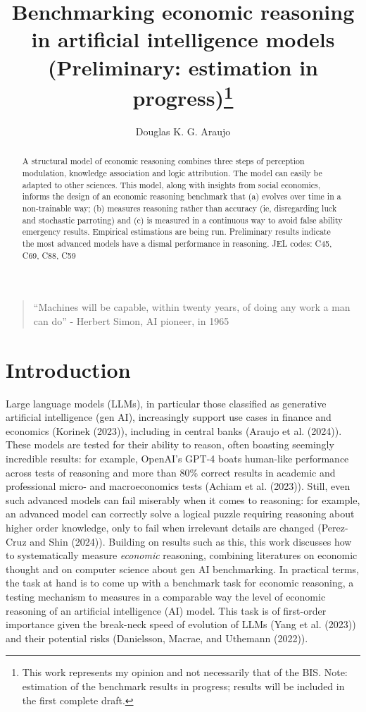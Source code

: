 \documentclass[
]{article}
\title{Benchmarking economic reasoning in artificial intelligence models
(Preliminary: estimation in progress)\thanks{This work represents my
opinion and not necessarily that of the BIS. Note: estimation of the
benchmark results in progress; results will be included in the first
complete draft.}}
\author{Douglas K. G. Araujo}
\affil{%
                  Bank for International
Settlements, douglas.araujo@bis.org
              }
\date{}
\begin{document}
\maketitle
\begin{abstract}
A structural model of economic reasoning combines three steps of
perception modulation, knowledge association and logic attribution. The
model can easily be adapted to other sciences. This model, along with
insights from social economics, informs the design of an economic
reasoning benchmark that (a) evolves over time in a non-trainable way;
(b) measures reasoning rather than accuracy (ie, disregarding luck and
stochastic parroting) and (c) is measured in a continuous way to avoid
false ability emergency results. Empirical estimations are being run.
Preliminary results indicate the most advanced models have a dismal
performance in reasoning. JEL codes: C45, C69, C88, C59
\end{abstract}

\begin{quote}
``Machines will be capable, within twenty years, of doing any work a man
can do'' - Herbert Simon, AI pioneer, in 1965
\end{quote}

\section{Introduction}\label{introduction}

Large language models (LLMs), in particular those classified as
generative artificial intelligence (gen AI), increasingly support use
cases in finance and economics (Korinek (2023)), including in central
banks (Araujo et al. (2024)). These models are tested for their ability
to reason, often boasting seemingly incredible results: for example,
OpenAI's GPT-4 boats human-like performance across tests of reasoning
and more than 80\% correct results in academic and professional micro-
and macroeconomics tests (Achiam et al. (2023)). Still, even such
advanced models can fail miserably when it comes to reasoning: for
example, an advanced model can correctly solve a logical puzzle
requiring reasoning about higher order knowledge, only to fail when
irrelevant details are changed (Perez-Cruz and Shin (2024)). Building on
results such as this, this work discusses how to systematically measure
\emph{economic} reasoning, combining literatures on economic thought and
on computer science about gen AI benchmarking. In practical terms, the
task at hand is to come up with a benchmark task for economic reasoning,
a testing mechanism to measures in a comparable way the level of
economic reasoning of an artificial intelligence (AI) model. This task
is of first-order importance given the break-neck speed of evolution of
LLMs (Yang et al. (2023)) and their potential risks (Danielsson, Macrae,
and Uthemann (2022)).
\end{document}
